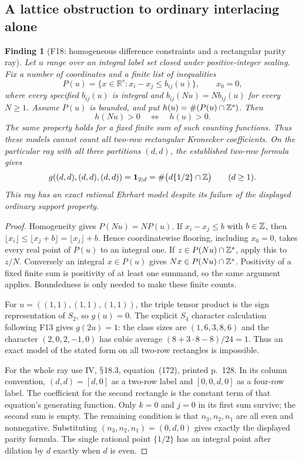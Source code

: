 \documentclass[11pt,a4paper]{article}
\renewcommand{\S}{\ensuremath{\mathsection}}
\newcommand{\fid}[1]{\textsf{#1}}\newcommand{\gate}[1]{\textsf{#1}}
\theoremstyle{named}\newtheorem{finding}{Finding}[section]
\theoremstyle{definition}\newtheorem{definition}[finding]{Definition}
\theoremstyle{remark}\newtheorem{remark}[finding]{Remark}
\begin{document}
\subsection{A lattice obstruction to ordinary interlacing alone}
\begin{finding}[\fid{F18}: homogeneous difference constraints and a rectangular parity ray]\label{f:saturation}
Let $u$ range over an integral label set closed under positive-integer scaling. Fix a number of coordinates and a finite list of inequalities
\[
 P(u)=\{x\in\mathbb R^s:x_i-x_j\le b_{ij}(u)\},\qquad x_0=0,
\]
where every specified $b_{ij}(u)$ is integral and $b_{ij}(Nu)=Nb_{ij}(u)$ for every $N\ge1$. Assume $P(u)$ is bounded, and put $h(u)=\#(P(u)\cap\mathbb Z^s)$. Then
\[
 h(Nu)>0\quad\Longleftrightarrow\quad h(u)>0.
\]
The same property holds for a fixed finite sum of such counting functions. Thus these models cannot count all two-row rectangular Kronecker coefficients. On the particular ray with all three partitions $(d,d)$, the established two-row formula gives
\[
 g((d,d),(d,d),(d,d))=\boldsymbol1_{2\mid d}
 =\#\bigl(d\{1/2\}\cap\mathbb Z\bigr)\qquad(d\ge1).
\]
This ray has an exact rational Ehrhart model despite its failure of the displayed ordinary support property.
\end{finding}
\begin{proof}
Homogeneity gives $P(Nu)=NP(u)$. If $x_i-x_j\le b$ with $b\in\mathbb Z$, then
$\lfloor x_i\rfloor\le\lfloor x_j+b\rfloor=\lfloor x_j\rfloor+b$.
Hence coordinatewise flooring, including $x_0=0$, takes every real point of $P(u)$ to an integral one. If $z\in P(Nu)\cap\mathbb Z^s$, apply this to $z/N$. Conversely an integral $x\in P(u)$ gives $Nx\in P(Nu)\cap\mathbb Z^s$. Positivity of a fixed finite sum is positivity of at least one summand, so the same argument applies. Boundedness is only needed to make these finite counts.

For $u=((1,1),(1,1),(1,1))$, the triple tensor product is the sign representation of $S_2$, so $g(u)=0$. The explicit $S_4$ character calculation following \fid{F13} gives $g(2u)=1$: the class sizes are $(1,6,3,8,6)$ and the character $(2,0,2,-1,0)$ has cubic average $(8+3\cdot8-8)/24=1$. Thus an exact model of the stated form on all two-row rectangles is impossible.

For the whole ray use IV, \S18.3, equation~(172), printed p.~128. In its column convention, $(d,d)=[d,0]$ as a two-row label and $[0,0,d,0]$ as a four-row label. The coefficient for the second rectangle is the constant term of that equation's generating function. Only $k=0$ and $j=0$ in its first sum survive; the second sum is empty. The remaining condition is that $n_3,n_2,n_1$ are all even and nonnegative. Substituting $(n_3,n_2,n_1)=(0,d,0)$ gives exactly the displayed parity formula. The single rational point $\{1/2\}$ has an integral point after dilation by $d$ exactly when $d$ is even.
\end{proof}
\end{document}
